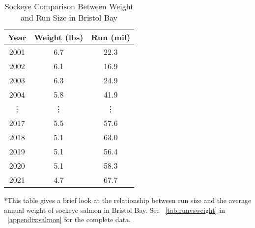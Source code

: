 \begin{table}[H]
    \centering
    \caption{Sockeye Comparison Between Weight and Run Size in Bristol Bay}\label{tab:weightvsrunshort}
    \vspace{.25cm}
    \begin{tabular}{|c|c|c|}
    \hline
         \textbf{Year} & \textbf{Weight (lbs)} & \textbf{Run (mil)} \\
    \hline
         2001 & 6.7 & 22.3\\
         2002 & 6.1 & 16.9\\
         2003 & 6.3 & 24.9\\
         2004 & 5.8 & 41.9\\
         \vdots & \vdots & \vdots\\
         2017 & 5.5 & 57.6\\
         2018 & 5.1 & 63.0\\
         2019 & 5.1 & 56.4\\
         2020 & 5.1 & 58.3\\
         2021 & 4.7 & 67.7\\
         \hline
    \end{tabular}
    \vspace{1ex}
    
    {\singlespacing
    *This table gives a brief look at the relationship between run size and the average annual weight of sockeye salmon in Bristol Bay. 
    See \tablename~\ref{tab:runvsweight} in \appendixname~\ref{appendix:salmon} for the complete data.\par}
\end{table}
